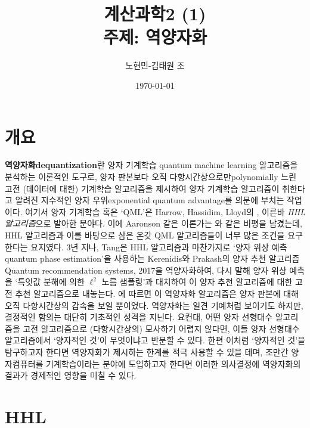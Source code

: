 \documentclass[a4paper,atbegshi,chapter,itemph,hidelinks]{oblivoir}
\title{계산과학2 (1)\\\textbf{주제: 역양자화}}
\author{노현민-김태원 조}
\date{\today}
\begin{document}
\maketitle
\newpage
\tableofcontents
\chapter{개요}
\textbf{역양자화\footnotesize dequantization}란 양자 기계학습{\footnotesize
quantum machine learning} 알고리즘을 분석하는 이론적인 도구로, 양자 판본보다 
오직 다항시간상으로만{\footnotesize polynomially} 느린 고전 (데이터에 대한) 
기계학습 알고리즘을 제시하여 양자 기계학습 알고리즘이 취한다고 알려진
지수적인 양자 우위{\footnotesize exponential quantum advantage}를 의문에
부치는 작업이다. 여기서 양자 기계학습 혹은 `QML'은 Harrow, Hassidim,
Lloyd의 , 이른바 \emph{HHL 알고리즘}으로 발아한
분야다. 이에 Aaronson 같은 이론가는 와 같은 비평을 남겼는데, HHL 알고리즘과 이를 바탕으로 삼은
온갖 QML 알고리즘들이 너무 많은 조건을 요구한다는 요지였다. 3년 지나, Tang은
HHL 알고리즘과 마찬가지로 `양자 위상 예측{\footnotesize quantum phase 
estimation}'을 사용하는 Kerenidis와 Prakash의 양자 추천 알고리즘{\tiny Quantum
recommendation systems, 2017}을 역양자화하여, 다시 말해 양자 위상 예측을 `특잇값
분해에 의한 $\ell^2$ 노름 샘플링'과 대치하여 이 양자 추천 알고리즘에 대한
고전 추천 알고리즘으로 내놓는다. 에 따르면 이 역양자화 알고리즘은 양자 판본에
대해 오직 다항시간상의 감속을 보일 뿐이었다. 역양자화는 일견 기예처럼
보이기도 하지만, 결정적인 함의는 대단히 기초적인 성격을 지닌다. 요컨대, 어떤 양자
선형대수 알고리즘을 고전 알고리즘으로 (다항시간상의) 모사하기 어렵지 않다면, 이들
양자 선형대수 알고리즘에서 `양자적인 것'이 무엇이냐고 반문할 수 있다. 한편
이처럼 `양자적인 것'을 탐구하고자 한다면 역양자화가 제시하는 한계를 적극
사용할 수 있을 테며, 조만간 양자컴퓨터를 기계학습이라는 분야에 도입하고자 한다면
이러한 의사결정에 역양자화의 결과가 경제적인 영향을 미칠 수 있다.

\chapter{HHL}
\end{document}
